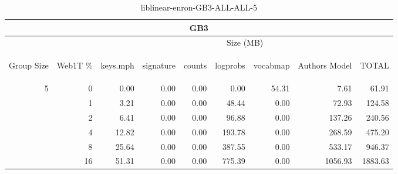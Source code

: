 \begin{center}
\begin{table}[htbp] 
 \begin{center}
\begin{tabular}{ | r | r | r | r | r | r | r | r | r |}
\hline
\multicolumn{9}{|c|}{GB3}\\
\hline
 & & \multicolumn{7}{|c|}{Size (MB)}\\ \cline{3-9}
\begin{sideways}Group Size\end{sideways} & \begin{sideways}Web1T \% \end{sideways} & \begin{sideways}keys.mph\end{sideways} & \begin{sideways}signature\end{sideways} & \begin{sideways}counts\end{sideways} & \begin{sideways}logprobs\end{sideways} & \begin{sideways}vocabmap\end{sideways} & \begin{sideways}Authors Model \end{sideways} & \begin{sideways}TOTAL\end{sideways}\\
\hline
\multirow{5}{*}{5}
 & 0 & 0.00 & 0.00 & 0.00 & 0.00 & 54.31 & 7.61 & 61.91\\ \cline{2-9}
 & 1 & 3.21 & 0.00 & 0.00 & 48.44 & 0.00 & 72.93 & 124.58\\ \cline{2-9}
 & 2 & 6.41 & 0.00 & 0.00 & 96.88 & 0.00 & 137.26 & 240.56\\ \cline{2-9}
 & 4 & 12.82 & 0.00 & 0.00 & 193.78 & 0.00 & 268.59 & 475.20\\ \cline{2-9}
 & 8 & 25.64 & 0.00 & 0.00 & 387.55 & 0.00 & 533.17 & 946.37\\ \cline{2-9}
 & 16 & 51.31 & 0.00 & 0.00 & 775.39 & 0.00 & 1056.93 & 1883.63\\ \cline{2-9}
\hline
\end{tabular}
\caption{liblinear-enron-GB3-ALL-ALL-5}
\label{table:liblinear-enron-GB3-ALL-ALL-5}
\end{center}
 \end{table}
\end{center}

